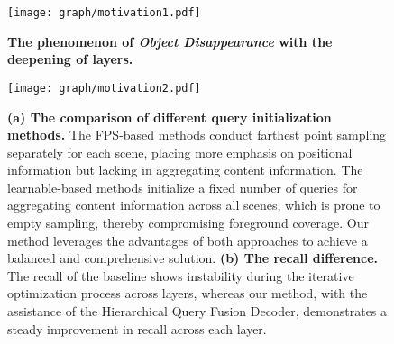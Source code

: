 \begin{figure}[!t]
    \vspace{-2.0em}
    \begin{center}
        \texttt{[image: graph/motivation1.pdf]}
        \caption{\textbf{The phenomenon of \textit{Object Disappearance} with the deepening of layers.} }
        \label{motivation1}
    \end{center}
    \vspace{-1.2em}
\end{figure}
\begin{figure}[!t]
    \vspace{-1.0em}
    \begin{center}
        \texttt{[image: graph/motivation2.pdf]}
        \caption{\textbf{(a) The comparison of different query initialization methods.} The FPS-based methods conduct farthest point sampling separately for each scene, placing more emphasis on positional information but lacking in aggregating content information. The learnable-based methods initialize a fixed number of queries for aggregating content information across all scenes, which is prone to empty sampling, thereby compromising foreground coverage. Our method leverages the advantages of both approaches to achieve a balanced and comprehensive solution. \textbf{(b) The recall difference.} The recall of the baseline shows instability during the iterative optimization process across layers, whereas our method, with the assistance of the Hierarchical Query Fusion Decoder, demonstrates a steady improvement in recall across each layer.\vspace{-1.0em}}
        
        \label{motivation}
    \end{center}
    \vspace{-1.0em}
\end{figure}

